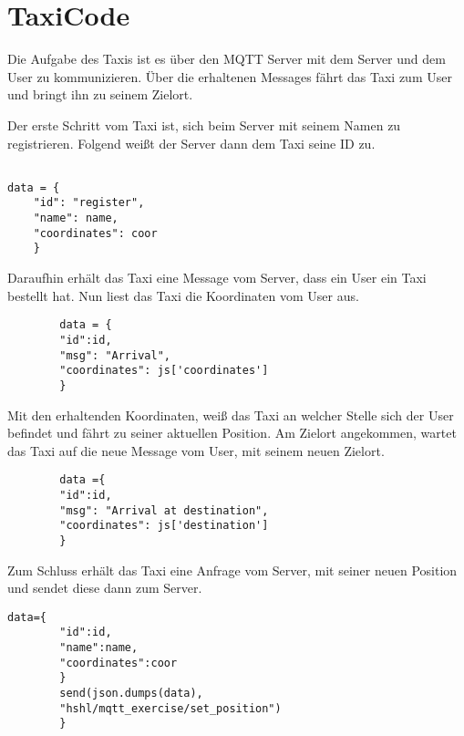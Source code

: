 \section{TaxiCode}

Die Aufgabe des Taxis ist es über den MQTT Server mit dem Server und dem User zu kommunizieren. Über die erhaltenen Messages fährt das Taxi zum User und bringt ihn zu seinem Zielort.

Der erste Schritt vom Taxi ist, sich beim Server mit seinem Namen zu registrieren. 
Folgend weißt der Server dann dem Taxi seine ID zu.

\begin{lstlisting} 

data = {
	"id": "register", 
	"name": name,
	"coordinates": coor
    }  
\end{lstlisting}

Daraufhin erhält das Taxi eine Message vom Server, dass ein User ein Taxi bestellt hat. Nun liest das Taxi die Koordinaten vom User aus. 

\begin{lstlisting} 
        data = {
        "id":id,
        "msg": "Arrival",
        "coordinates": js['coordinates']
        }
\end{lstlisting}

Mit den erhaltenden Koordinaten, weiß das Taxi an welcher Stelle sich der User befindet und fährt zu seiner aktuellen Position. Am Zielort angekommen, wartet das Taxi auf die neue Message vom User, mit seinem neuen Zielort.

\begin{lstlisting} 
        data ={
        "id":id,
        "msg": "Arrival at destination",
        "coordinates": js['destination']
        }
\end{lstlisting}

Zum Schluss erhält das Taxi eine Anfrage vom Server, mit seiner neuen Position und sendet diese dann zum Server.

\begin{lstlisting} 
data={
        "id":id,
        "name":name,
        "coordinates":coor
        }
        send(json.dumps(data),
        "hshl/mqtt_exercise/set_position")
        }
\end{lstlisting}
